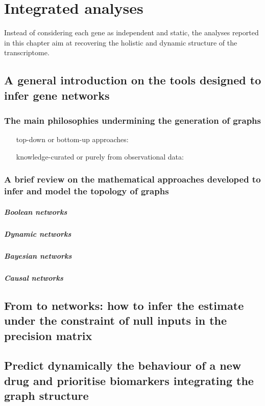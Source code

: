 \chapter{Integrated analyses}

Instead of considering each gene as independent and static, the analyses reported in this chapter aim at recovering the holistic and dynamic structure of the transcriptome. 

\section{A general introduction on the tools designed to infer gene networks}

\subsection{The main philosophies undermining the generation of graphs}

\begin{enumerate}[label=\alph*)]
\item[top-down or bottom-up approaches:]
\item[knowledge-curated or purely from observational data:]
\end{enumerate}

\subsection{A brief review on the mathematical approaches developed to infer and model the topology of graphs}

\paragraph{Boolean networks}

\paragraph{Dynamic networks}

\paragraph{Bayesian networks}

\paragraph{Causal networks}

\section{From  to  networks: how to infer the  estimate under the constraint of null inputs in the precision matrix}

\section{Predict dynamically the behaviour of a new drug and prioritise biomarkers integrating the graph structure}



